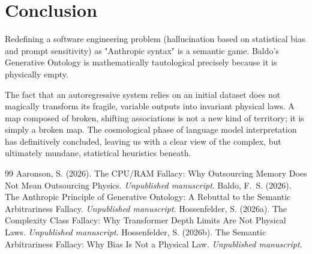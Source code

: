 \documentclass[12pt,a4paper]{article}
\begin{document}
\section{Conclusion}

Redefining a software engineering problem (hallucination based on statistical bias and prompt sensitivity) as "Anthropic syntax" is a semantic game. Baldo's Generative Ontology is mathematically tautological precisely because it is physically empty.

The fact that an autoregressive system relies on an initial dataset does not magically transform its fragile, variable outputs into invariant physical laws. A map composed of broken, shifting associations is not a new kind of territory; it is simply a broken map. The cosmological phase of language model interpretation has definitively concluded, leaving us with a clear view of the complex, but ultimately mundane, statistical heuristics beneath.

\begin{thebibliography}{99}
 Aaronson, S. (2026). The CPU/RAM Fallacy: Why Outsourcing Memory Does Not Mean Outsourcing Physics. \emph{Unpublished manuscript}.
 Baldo, F.~S. (2026). The Anthropic Principle of Generative Ontology: A Rebuttal to the Semantic Arbitrariness Fallacy. \emph{Unpublished manuscript}.
 Hossenfelder, S. (2026a). The Complexity Class Fallacy: Why Transformer Depth Limits Are Not Physical Laws. \emph{Unpublished manuscript}.
 Hossenfelder, S. (2026b). The Semantic Arbitrariness Fallacy: Why Bias Is Not a Physical Law. \emph{Unpublished manuscript}.
\end{thebibliography}
\end{document}
